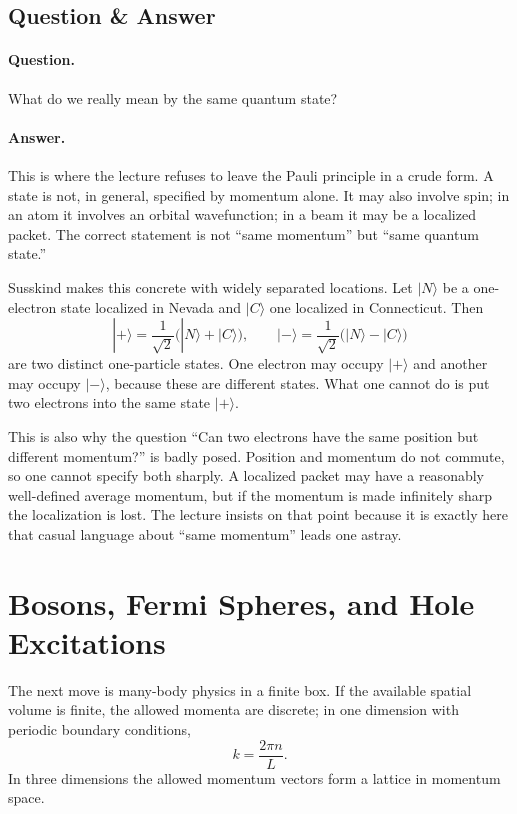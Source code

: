 \subsection{Question \& Answer}

\paragraph{Question.} What do we really mean by the same quantum state?

\paragraph{Answer.} This is where the lecture refuses to leave the Pauli principle in a crude form. A state is not, in general, specified by momentum alone. It may also involve spin; in an atom it involves an orbital wavefunction; in a beam it may be a localized packet. The correct statement is not ``same momentum'' but ``same quantum state.''

Susskind makes this concrete with widely separated locations. Let \(|N\rangle\) be a one-electron state localized in Nevada and \(|C\rangle\) one localized in Connecticut. Then
\begin{equation}
|+\rangle=\frac{1}{\sqrt{2}}\bigl(|N\rangle+|C\rangle\bigr),
\qquad
|-\rangle=\frac{1}{\sqrt{2}}\bigl(|N\rangle-|C\rangle\bigr)
\end{equation}
are two distinct one-particle states. One electron may occupy \(|+\rangle\) and another may occupy \(|-\rangle\), because these are different states. What one cannot do is put two electrons into the same state \(|+\rangle\).

This is also why the question ``Can two electrons have the same position but different momentum?'' is badly posed. Position and momentum do not commute, so one cannot specify both sharply. A localized packet may have a reasonably well-defined average momentum, but if the momentum is made infinitely sharp the localization is lost. The lecture insists on that point because it is exactly here that casual language about ``same momentum'' leads one astray.

\section{Bosons, Fermi Spheres, and Hole Excitations}

The next move is many-body physics in a finite box. If the available spatial volume is finite, the allowed momenta are discrete; in one dimension with periodic boundary conditions,
\begin{equation}
k=\frac{2\pi n}{L}.
\end{equation}
In three dimensions the allowed momentum vectors form a lattice in momentum space.

